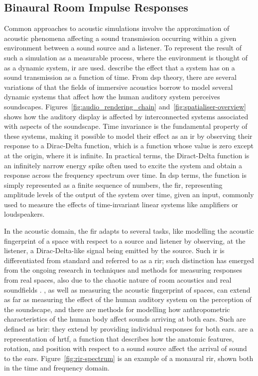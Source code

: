 \subsection{Binaural Room Impulse Responses}\label{sec:ir-definition}
Common approaches to acoustic simulations involve the approximation of acoustic phenomena affecting a sound transmission occurring within a given environment between a sound source and a listener. To represent the result of such a simulation as a measurable process, where the environment is thought of as a dynamic system, \acrfull{ir} are used.  describe the effect that a system has on a sound transmission as a function of time. From \acrshort{dsp} theory, there are several variations of  that the fields of immersive acoustics borrow to model several dynamic systems that affect how the human auditory system perceives soundscapes. Figures~\ref{fig:audio_rendering_chain} and~\ref{fig:spatialiser-overview} shows how the auditory display is affected by interconnected systems associated with aspects of the soundscape. Time invariance is the fundamental property of these systems, making it possible to model their effect as an \acrshort{ir} by observing their response to a Dirac-Delta function, which is a function whose value is zero except at the origin, where it is infinite. In practical terms, the Diract-Delta function is an infinitely narrow energy spike often used to excite the system and obtain a response across the frequency spectrum over time. In \acrshort{dsp} terms, the function is simply represented as a finite sequence of numbers, the \acrfull{fir}, representing amplitude levels of the output of the system over time, given an input, commonly used to measure the effects of time-invariant linear systems like amplifiers or loudspeakers.\par
In the acoustic domain, the \acrshort{fir} adapts to several tasks, like modelling the acoustic fingerprint of a space with respect to a source and listener by observing, at the listener, a Dirac-Delta-like signal being emitted by the source. Such \acrshort{ir} is differentiated from standard  and referred to as a \acrfull{rir}; such distinction has emerged from the ongoing research in techniques and methods for measuring responses from real spaces, also due to the chaotic nature of room acoustics and real soundfields \citep{farina07}. 
, as well as measuring the acoustic fingerprint of spaces, can extend as far as measuring the effect of the human auditory system on the perception of the soundscape, and there are methods for modelling how anthropometric characteristics of the human body affect sounds arriving at both ears. Such  are defined as \acrfull{brir}: they extend  by providing individual responses for both ears.  are a representation of \acrshort{hrtf}, a function that describes how the anatomic features, rotation, and position with respect to a sound source affect the arrival of sound to the ears. Figure~\ref{fig:rir-spectrum} is an example of a monaural \acrshort{rir}, shown both in the time and frequency domain. 
